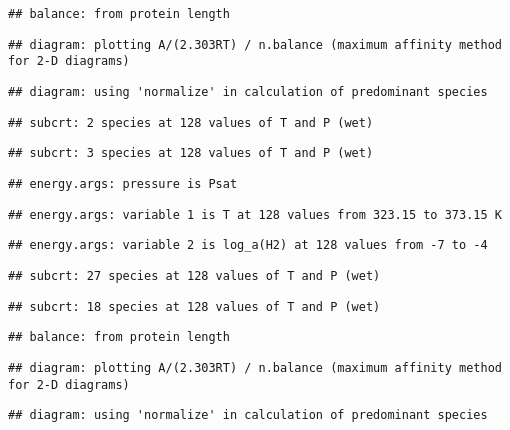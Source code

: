 \documentclass[]{article}
\begin{document}
\begin{verbatim}
## balance: from protein length
\end{verbatim}

\begin{verbatim}
## diagram: plotting A/(2.303RT) / n.balance (maximum affinity method for 2-D diagrams)
\end{verbatim}

\begin{verbatim}
## diagram: using 'normalize' in calculation of predominant species
\end{verbatim}

\begin{verbatim}
## subcrt: 2 species at 128 values of T and P (wet)
\end{verbatim}

\begin{verbatim}
## subcrt: 3 species at 128 values of T and P (wet)
\end{verbatim}

\begin{verbatim}
## energy.args: pressure is Psat
\end{verbatim}

\begin{verbatim}
## energy.args: variable 1 is T at 128 values from 323.15 to 373.15 K
\end{verbatim}

\begin{verbatim}
## energy.args: variable 2 is log_a(H2) at 128 values from -7 to -4
\end{verbatim}

\begin{verbatim}
## subcrt: 27 species at 128 values of T and P (wet)
\end{verbatim}

\begin{verbatim}
## subcrt: 18 species at 128 values of T and P (wet)
\end{verbatim}

\begin{verbatim}
## balance: from protein length
\end{verbatim}

\begin{verbatim}
## diagram: plotting A/(2.303RT) / n.balance (maximum affinity method for 2-D diagrams)
\end{verbatim}

\begin{verbatim}
## diagram: using 'normalize' in calculation of predominant species
\end{verbatim}
\end{document}
